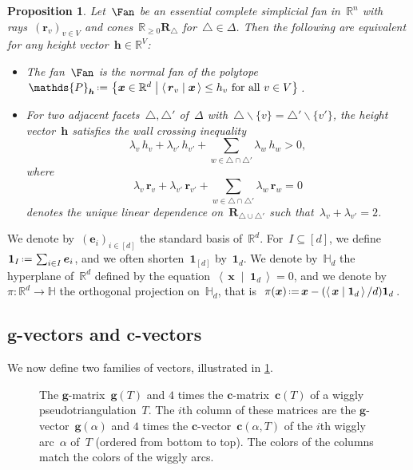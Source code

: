 \documentclass{amsart}
\newtheorem{proposition}[theorem]{Proposition}
\theoremstyle{definition}
\newcommand{\R}{\mathbb{R}} %
\newcommand{\HH}{\mathbb{H}} %
\renewcommand{\b}[1]{{\boldsymbol{#1}}} %
\newcommand{\set}[2]{\left\{ #1 \;\middle|\; #2 \right\}} %
\newcommand{\ssm}{\smallsetminus} %
\newcommand{\dotprod}[2]{\left\langle \, #1 \; \middle| \; #2 \, \right\rangle} %
\newcommand{\one}{\b{1}} %
\newcommand{\eqdef}{\mbox{\,\raisebox{0.2ex}{\scriptsize\ensuremath{\mathrm:}}\ensuremath{=}\,}} %
\newcommand{\darkblue}{\color{darkblue}} %
\newcommand{\defn}[1]{\textsl{\darkblue #1}} %
\newcommand{\polytope}[1]{\mathds{#1}} %
\begin{document}
\begin{proposition}
\label{prop:characterizationPolytopalFan}
Let~$\Fan$ be an essential complete simplicial fan in~$\R^n$ with rays~$(\b{r}_v)_{v \in V}$ and cones~$\R_{\ge 0} \b{R}_\triangle$ for~$\triangle \in \Delta$.
Then the following are equivalent for any height vector~$\b{h} \in \R^V$:
\begin{itemize}
\item The fan~$\Fan$ is the normal fan of the polytope~$\polytope{P}_{\b{h}} \eqdef \set{\b{x} \in \R^d}{\dotprod{\b{r}_v}{\b{x}} \le h_v \text{ for all } v \in V}$.
\item For two adjacent facets~$\triangle, \triangle'$ of~$\Delta$ with~$\triangle \ssm \{v\} = \triangle' \ssm \{v'\}$, the height vector~$\b{h}$ satisfies the \defn{wall crossing inequality}
\[
\lambda_v \, h_v + \lambda_{v'} \, h_{v'} + \sum_{w \in \triangle \cap \triangle'} \lambda_w \, h_w > 0,
\]
where
\[
\lambda_v \, \b{r}_v + \lambda_{v'} \, \b{r}_{v'} + \sum_{w \in \triangle \cap \triangle'} \lambda_w \, \b{r}_w = 0
\]
denotes the unique linear dependence on~$\b{R}_{\triangle \cup \triangle'}$ such that~$\lambda_v + \lambda_{v'} = 2$.
\end{itemize}
\end{proposition}

We denote by~$(\b{e}_i)_{i \in [d]}$ the standard basis of~$\R^d$.
For~$I \subseteq [d]$, we define~$\one_I \eqdef \sum_{i \in I} \b{e}_i$, and we often shorten~$\one_{[d]}$ by~$\one_d$.
We denote by~$\HH_d$ the hyperplane of~$\R^d$ defined by the equation~$\dotprod{\b{x}}{\one_d} = 0$, and we denote by~$\pi : \R^d \to \HH$ the orthogonal projection on~$\HH_d$, that is~$\pi(\b{x}) \eqdef \b{x} - (\dotprod{\b{x}}{\one_d} / d) \one_d$.


\subsection{$\b{g}$-vectors and $\b{c}$-vectors}
\label{subsec:gcvectors}

We now define two families of vectors, illustrated in \cref{fig:pseudotriangulationMatrices}.
%
\begin{figure}
\centerline{ \quad }
\caption{The $\b{g}$-matrix~$\b{g}(T)$ and $4$ times the $\b{c}$-matrix~$\b{c}(T)$ of a wiggly pseudotriangulation~$T$. The $i$th column of these matrices are the $\b{g}$-vector~$\b{g}(\alpha)$ and $4$ times the $\b{c}$-vector~$\b{c}(\alpha, T)$ of the $i$th wiggly arc~$\alpha$ of~$T$ (ordered from bottom to top). The colors of the columns match the colors of the wiggly arcs.}
\label{fig:pseudotriangulationMatrices}
\end{figure}
\end{document}
